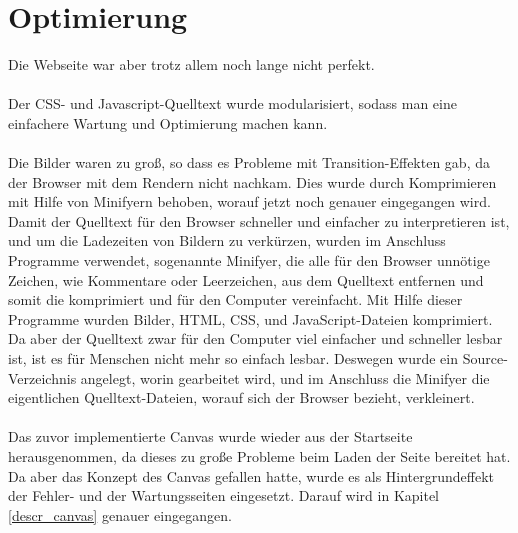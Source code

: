 \section{Optimierung}
Die Webseite war aber trotz allem noch lange nicht perfekt. 
\\
\\
Der CSS- und Javascript-Quelltext wurde modularisiert, sodass man eine einfachere Wartung und Optimierung machen kann.
\\
\\
Die Bilder waren zu groß, so dass es Probleme mit Transition-Effekten gab, da der Browser mit dem Rendern nicht nachkam. Dies wurde durch Komprimieren mit Hilfe von Minifyern behoben, worauf jetzt noch genauer eingegangen wird.
\\
Damit der Quelltext für den Browser schneller und einfacher zu interpretieren ist, und um die Ladezeiten von Bildern zu verkürzen, wurden im Anschluss Programme verwendet, sogenannte Minifyer, die alle für den Browser unnötige Zeichen, wie Kommentare oder Leerzeichen, aus dem Quelltext entfernen und somit die komprimiert und für den Computer vereinfacht. Mit Hilfe dieser Programme wurden Bilder, HTML, CSS, und JavaScript-Dateien komprimiert. Da aber der Quelltext zwar für den Computer viel einfacher und schneller lesbar ist, ist es für Menschen nicht mehr so einfach lesbar. Deswegen wurde ein Source-Verzeichnis angelegt, worin gearbeitet wird, und im Anschluss die Minifyer die eigentlichen Quelltext-Dateien, worauf sich der Browser bezieht, verkleinert. 
\\
\\
Das zuvor implementierte Canvas wurde wieder aus der Startseite herausgenommen, da dieses zu große Probleme beim Laden der Seite bereitet hat. Da aber das Konzept des Canvas gefallen hatte, wurde es als Hintergrundeffekt der Fehler- und der Wartungsseiten eingesetzt. Darauf wird in Kapitel \ref{descr_canvas} genauer eingegangen.
